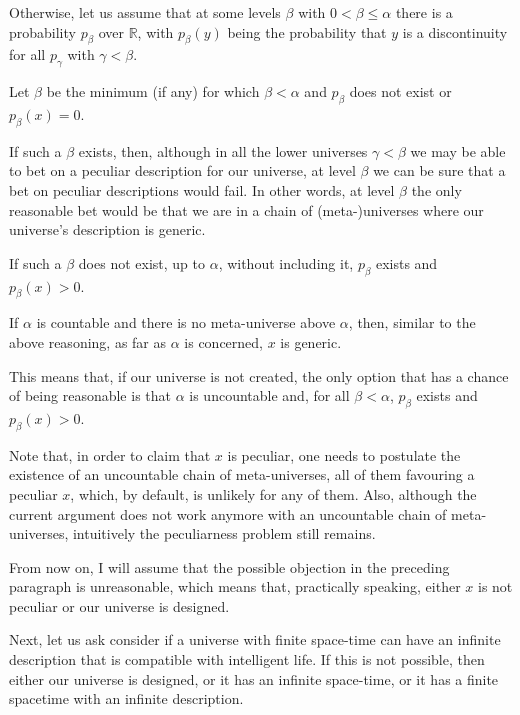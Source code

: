 \documentclass[a4paper
,draft
]{article}
\newcommand{\svn}[2][]{\todo[author=Virgil,color=red!25!white,#1]{#2}}
\def\reale{\mathbb{R}}
\begin{document}
Otherwise, let us assume that at some levels $\beta$ with
$0 < \beta \le \alpha$ there is a probability
$p_\beta$ over $\reale$, with $p_\beta(y)$ being the probability that $y$ is
a discontinuity for all $p_\gamma$ with $\gamma < \beta$.

Let $\beta$ be the minimum (if any) for which $\beta < \alpha$ and
$p_\beta$ does not exist or $p_\beta(x) = 0$.


If such a $\beta$ exists, then, although in all the lower universes
$\gamma < \beta$ we may be able to bet on a peculiar description for our
universe, at level $\beta$ we can be sure that a bet on peculiar descriptions
would fail. In other words, at level $\beta$ the only reasonable bet would be
that we are in a chain of (meta-)universes where our universe's description is
generic.

If such a $\beta$ does not exist, up to $\alpha$, without including it,
$p_\beta$ exists and $p_\beta(x) > 0$.

If $\alpha$ is countable and there is no meta-universe above $\alpha$,
then, similar to the above reasoning, as far as $\alpha$ is concerned,
$x$ is generic.

This means that, if our universe is not created, the only option that
has a chance of being reasonable is that $\alpha$ is uncountable and,
for all $\beta < \alpha$, $p_\beta$ exists and $p_\beta(x) > 0$.

Note that, in order to claim that $x$ is peculiar, one needs to postulate the
existence of an uncountable chain of meta-universes, all of them favouring a
peculiar $x$, which, by default, is unlikely for any of them. Also, although the
current argument does not work anymore with an uncountable chain of
meta-universes, intuitively the peculiarness problem still remains.

From now on, I will assume that the possible objection in the preceding
paragraph is unreasonable, which means that, practically speaking,
either $x$ is not peculiar or our universe is designed.

Next, let us ask consider if a universe with finite space-time can have an
infinite description that is compatible with intelligent life. If this is not
possible, then either our universe is designed, or it has an infinite
space-time, or it has a finite spacetime with an infinite description.
\end{document}
